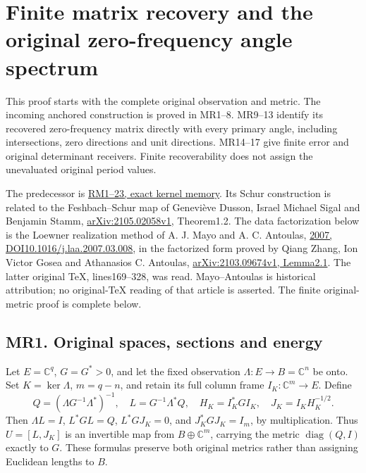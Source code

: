 \documentclass[11pt]{article}
\begin{document}
\section{Finite matrix recovery and the original zero-frequency angle spectrum}\label{finite-matrix-recovery-and-the-original-zero-frequency-angle-spectrum}

This proof starts with the complete original observation and metric. The incoming anchored construction is proved in MR1--8. MR9--13 identify its recovered zero-frequency matrix directly with every primary angle, including intersections, zero directions and unit directions. MR14--17 give finite error and original determinant receivers. Finite recoverability does not assign the unevaluated original period values.

The predecessor is \href{https://github.com/KokunoYumeto/zeta-function-research-reader/blob/13ca9b136fcdae48df7454bd9bf99e1ef22dd03c/workbenches/splitzero-tandem/continuations/20260922-original-growth-resolvent/ORIGINAL_RESOLVENT_MEMORY_PROOFS.md}{RM1--23, exact kernel memory}. Its Schur construction is related to the Feshbach--Schur map of Geneviève Dusson, Israel Michael Sigal and Benjamin Stamm, \href{https://arxiv.org/abs/2105.02058v1}{arXiv:2105.02058v1}, Theorem1.2. The data factorization below is the Loewner realization method of A. J. Mayo and A. C. Antoulas, \href{https://doi.org/10.1016/j.laa.2007.03.008}{2007, DOI10.1016/j.laa.2007.03.008}, in the factorized form proved by Qiang Zhang, Ion Victor Gosea and Athanasios C. Antoulas, \href{https://arxiv.org/abs/2103.09674v1}{arXiv:2103.09674v1, Lemma2.1}. The latter original TeX, lines169--328, was read. Mayo--Antoulas is historical attribution; no original-TeX reading of that article is asserted. The finite original-metric proof is complete below.

\subsection{MR1. Original spaces, sections and energy}\label{mr1.-original-spaces-sections-and-energy}

Let \(E=\mathbb C^q\), \(G=G^*>0\), and let the fixed observation \(\Lambda:E\to B=\mathbb C^n\) be onto. Set \(K=\ker\Lambda\), \(m=q-n\), and retain its full column frame \(I_K:\mathbb C^m\to E\). Define \[
 Q=(\Lambda G^{-1}\Lambda^*)^{-1},\quad
 L=G^{-1}\Lambda^*Q,\quad H_K=I_K^*GI_K,\quad
 J_K=I_KH_K^{-1/2}.
\tag{MR1}
\] Then \(\Lambda L=I\), \(L^*GL=Q\), \(L^*GJ_K=0\), and \(J_K^*GJ_K=I_m\), by multiplication. Thus \(U=[L,J_K]\) is an invertible map from \(B\oplus\mathbb C^m\), carrying the metric \(\operatorname{diag}(Q,I)\) exactly to \(G\). These formulas preserve both original metrics rather than assigning Euclidean lengths to \(B\).
\end{document}
